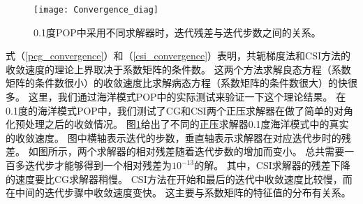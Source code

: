 \begin {figure}
\vspace{10pt}
\centering
\texttt{[image: Convergence\_diag]}
\caption[] {0.1度POP中采用不同求解器时，迭代残差与迭代步数之间的关系。\label{fig:convergence_diag}}
\end{figure}
式（\ref{pcg_convergence}）和（\ref{csi_convergence}）表明，共轭梯度法和CSI方法的收敛速度的理论上界取决于系数矩阵的条件数。 
这两个方法求解良态方程（系数矩阵的条件数很小）的收敛速度比求解病态方程（系数矩阵的条件数很大）的快很多。
这里，我们通过海洋模式POP中的实际测试来验证一下这个理论结果。 
在0.1度的海洋模式POP中，我们测试了CG和CSI两个正压求解器在做了简单的对角化预处理之后的收敛情况。
图\ref{fig:convergence_diag}给出了不同的正压求解器0.1度海洋模式中的真实的收敛速度。
图中横轴表示迭代的步数，垂直轴表示求解器在对应迭代步时的残差。 
如图所示，两个求解器的相对残差随着迭代步数的增加而变小。
总共需要一百多迭代步才能够得到一个相对残差为$10^{-13}$的解。
其中，CSI求解器的残差下降的速度要比CG求解器稍慢。
CSI方法在开始和最后的迭代中收敛速度比较慢，而在中间的迭代步骤中收敛速度变快。
这主要与系数矩阵的特征值的分布有关系。 


